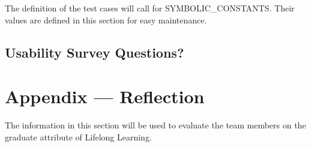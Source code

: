 \documentclass[12pt, titlepage]{article}
\begin{document}
The definition of the test cases will call for SYMBOLIC\_CONSTANTS.
Their values are defined in this section for easy maintenance.

\subsection{Usability Survey Questions?}

\newpage{}
\section*{Appendix --- Reflection}


The information in this section will be used to evaluate the team members on the
graduate attribute of Lifelong Learning.


\end{document}
